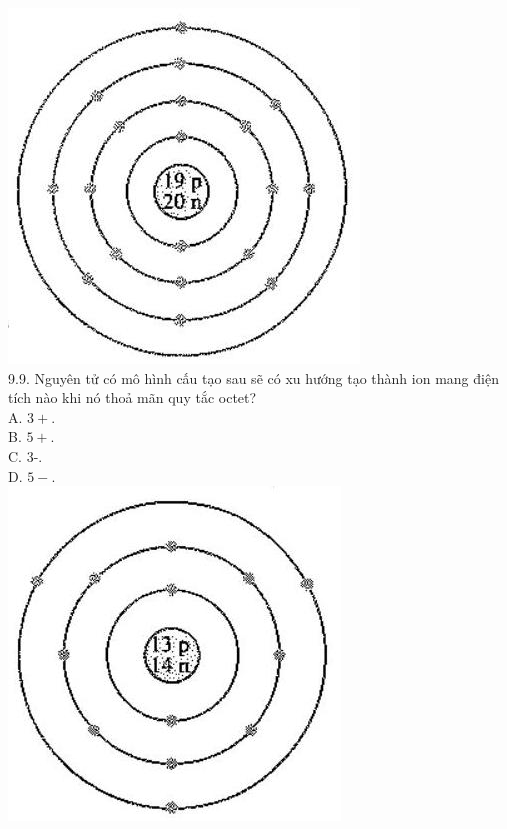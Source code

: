 \documentclass[10pt]{article}
\begin{document}
\begin{enumerate}
\includegraphics[max width=\textwidth, center]{2025_10_23_76620c17ffac1ae9b35bg-25}\\
9.9. Nguyên tử có mô hình cấu tạo sau sẽ có xu hướng tạo thành ion mang điện tích nào khi nó thoả mãn quy tắc octet?\\
A. $3+$.\\
B. $5+$.\\
C. 3-.\\
D. $5-$.\\
\includegraphics[max width=\textwidth, center]{2025_10_23_76620c17ffac1ae9b35bg-25(2)}\\

\end{enumerate}
\end{document}
